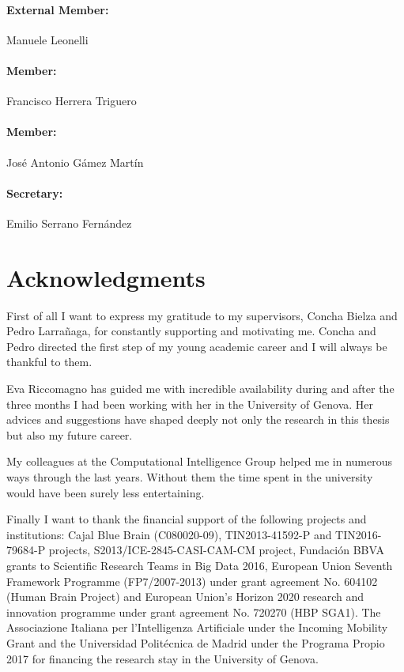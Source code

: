 \documentclass[11pt,a4paper, twoside]{book}
\begin{document}
\paragraph{External Member:} Manuele Leonelli
\paragraph{Member:} Francisco Herrera Triguero
\paragraph{Member:} José Antonio Gámez Martín
\paragraph{Secretary:}  Emilio Serrano Fernández

\pagebreak[4]


\frontmatter
\pagestyle{fancy}
\fancyhead[LE,RO]{}
\fancyhead[LO,RE]{}
\renewcommand{\headrulewidth}{0pt}


\section*{Acknowledgments}

First of all I want to express my gratitude to my supervisors, Concha Bielza and Pedro Larrañaga, for constantly supporting and motivating me.
Concha and Pedro directed the first step of my young academic career and I will always be thankful to them.   

Eva Riccomagno has guided me with incredible availability during and after the three months I had been working with her in the University of Genova. Her advices and suggestions have shaped deeply not only the research in this thesis but also my future career. 

My colleagues at the Computational Intelligence Group helped me in numerous ways through the last years. Without them the time spent in the university would have been surely less entertaining.
 
Finally I want to thank the financial support of the following projects and institutions:
Cajal Blue Brain (C080020-09), TIN2013-41592-P and TIN2016-79684-P projects, S2013/ICE-2845-CASI-CAM-CM project, Fundación BBVA grants to Scientific Research Teams in Big Data 2016, European Union Seventh Framework Programme (FP7/2007-2013) under grant agreement No. 604102 (Human Brain Project) and European Union’s Horizon 2020 research and innovation programme under grant agreement No. 720270 (HBP SGA1). The Associazione Italiana per l'Intelligenza Artificiale under the Incoming Mobility Grant and the Universidad Polit\'ecnica de Madrid under the Programa Propio 2017 for financing the research stay in the University of Genova. 
\end{document}
